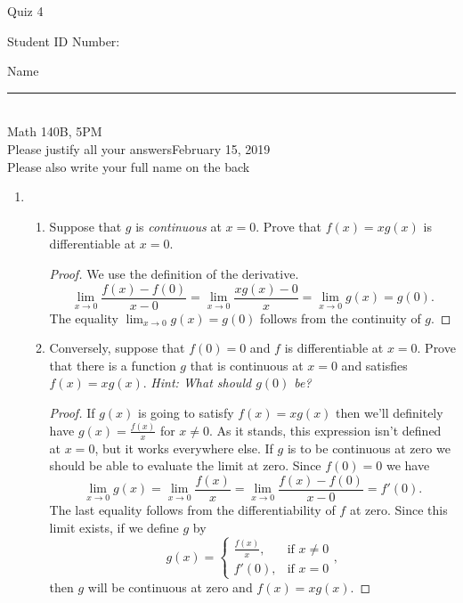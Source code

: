 \documentclass[12pt]{article}
\begin{document}
\begin{flushleft} 
\centerline{\LARGE{Quiz 4}} 
\vspace{5 mm}
{Student ID Number:}\hfill  
{Name \rule {2 in}{0.01in}}\\
Math 140B, 5PM
\\
{Please justify all your answers}\hfill {February 15, 2019}
\\
{Please also write your full name on the back} 

\medskip
\end{flushleft}

\begin{enumerate}
	\item \begin{enumerate}
		\item Suppose that $g$ is \textit{continuous} at $x=0$. Prove that $f(x) = xg(x)$ is differentiable at $x = 0$.
		\begin{proof}
			We use the definition of the derivative.
			\[
			\lim_{x\to 0}\frac{f(x)-f(0)}{x-0} = \lim_{x\to 0}\frac{xg(x) - 0}{x} = \lim_{x\to 0}g(x) = g(0).
			\]
			The equality $\lim_{x\to 0}g(x) = g(0)$ follows from the continuity of $g$.
		\end{proof}
		\vfill
		\item Conversely, suppose that $f(0) = 0$ and $f$ is differentiable at $x=0$. Prove that there is a function $g$ that is continuous at $x=0$ and satisfies $f(x) = xg(x)$. \textit{Hint: What should $g(0)$ be?}
		\begin{proof}
			If $g(x)$ is going to satisfy $f(x) = xg(x)$ then we'll definitely have $g(x) = \frac{f(x)}{x}$ for $x\neq 0$. As it stands, this expression isn't defined at $x=0$, but it works everywhere else. If $g$ is to be continuous at zero we should be able to evaluate the limit at zero. Since $f(0)=0$ we have
			\[
			\lim_{x\to 0}g(x) = \lim_{x\to 0}\frac{f(x)}{x} = \lim_{x\to 0}\frac{f(x)-f(0)}{x-0} = f'(0).
			\]
			The last equality follows from the differentiability of $f$ at zero. Since this limit exists, if we define $g$ by
			\[
			g(x) = \begin{cases}
				\frac{f(x)}{x},&\text{if }x\neq 0\\
				f'(0),&\text{if }x=0
			\end{cases},
			\]
			then $g$ will be continuous at zero and $f(x) = xg(x)$.
		\end{proof}
	\end{enumerate}
	\vfill


\end{enumerate}
\end{document}
